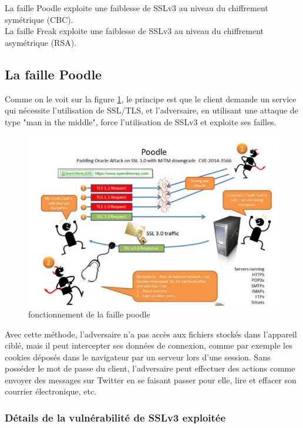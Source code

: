 La faille Poodle exploite une faiblesse de SSLv3 au niveau du chiffrement symétrique (CBC). \\
La faille Freak exploite une faiblesse de SSLv3 au niveau du chiffrement asymétrique (RSA).

\subsection{La faille Poodle}

Comme on le voit sur la figure \ref{poodle}, le principe est que le client demande un service qui nécessite l'utilisation de SSL/TLS, et l'adversaire, en utilisant une attaque de type "man in the middle", force l'utilisation de SSLv3 et exploite ses failles.

\begin{figure}[H]
\includegraphics[scale=0.8]{img/poodle.jpg}
\caption{fonctionnement de la faille poodle}
\label{poodle}
\end{figure}

Avec cette méthode, l'adversaire n’a pas accès aux fichiers stockés dans l’appareil ciblé, mais il peut intercepter ses données de connexion, comme par exemple les cookies déposés dans le navigateur par un serveur lors d’une session. Sans posséder le mot de passe du client, l'adversaire peut effectuer des actions comme envoyer des messages sur Twitter en se faisant passer pour elle, lire et effacer son courrier électronique, etc.

\subsubsection{Détails de la vulnérabilité de SSLv3 exploitée}

